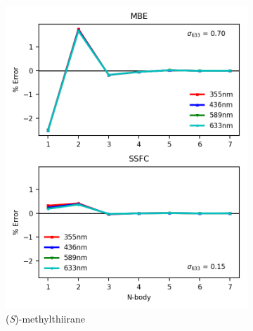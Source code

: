 \begin{figure}
\begin{subfigure}{0.5\textwidth}
                \centering\includegraphics[scale=0.75]{p1/graphs/metthi_6_pol.png}
                \caption{(\textit{S})-methylthiirane}
                \label{metthi_6_pol}
            \end{subfigure}
            \begin{subfigure}{0.5\textwidth}

\end{subfigure}
\end{figure}
